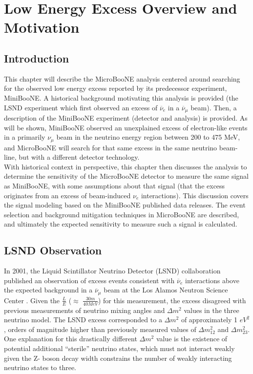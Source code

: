 \section{Low Energy Excess Overview and Motivation}
\subsection{Introduction}
This chapter will describe the MicroBooNE analysis centered around searching for the observed low energy excess reported by its predecessor experiment, MiniBooNE. A historical background motivating this analysis is provided (the LSND experiment which first observed an excess of $\overline{\nu}_e$ in a $\overline{\nu}_\mu$ beam). Then, a description of the MiniBooNE experiment (detector and analysis) is provided. As will be shown, MiniBooNE observed an unexplained excess of electron-like events in a primarily $\nu_\mu$ beam in the neutrino energy region between 200 to 475 MeV, and MicroBooNE will search for that same excess in the same neutrino beam-line, but with a different detector technology.\\

With historical context in perspective, this chapter then discusses the analysis to determine the sensitivity of the MicroBooNE detector to measure the same signal as MiniBooNE, with some assumptions about that signal (that the excess originates from an excess of beam-induced $\nu_e$ interactions). This discussion covers the signal modeling based on the MiniBooNE published data releases. The event selection and background mitigation techniques in MicroBooNE are described, and ultimately the expected sensitivity to measure such a signal is calculated.

\subsection{LSND Observation}

In 2001, the Liquid Scintillator Neutrino Detector (LSND) collaboration published an observation of excess events consistent with $\overline{\nu}_e$ interactions above the expected background in a $\overline{\nu}_\mu$ beam at the Los Alamos Neutron Science Center \cite{LSNDPaper}. Given the $\frac{L}{E}$ ($\approx$ $\frac{30 m}{40 MeV}$) for this measurement, the excess disagreed with previous measurements of neutrino mixing angles and $\Delta m^2$ values in the three neutrino model. The LSND excess corresponded to a $\Delta m^2$ of approximately 1 $eV^2$, orders of magnitude higher than previously measured values of $\Delta m_{12}^2$ and $\Delta m_{23}^2$. One explanation for this drastically different $\Delta m^2$ value is the existence of potential additional ``sterile'' neutrino states, which must not interact weakly given the Z- boson decay width constrains the number of weakly interacting neutrino states to three.\\

